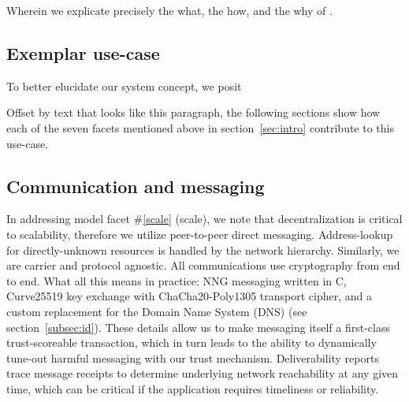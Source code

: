 %
%
%

Wherein we explicate precisely the what, the how, and the why of \projectName.

\subsection{Exemplar use-case}\label{subsec:use}

To better elucidate our system concept, we posit 

\begin{ppl}
Offset by text that looks like this paragraph, the following sections show how each of the seven facets mentioned above in section~\ref{sec:intro} contribute to this use-case.

\end{ppl}

\subsection{Communication and messaging}\label{subsec:comms}

In addressing model facet \#\ref{scale} (scale), we note that decentralization is critical to scalability, therefore we utilize peer-to-peer direct messaging.
Address-lookup for directly-unknown resources is handled by the network hierarchy.
Similarly, we are carrier and protocol agnostic.
All communications use cryptography from end to end.  %
What all this means in practice: NNG messaging written in C, Curve25519 key exchange with ChaCha20-Poly1305 transport cipher, and a custom replacement for the Domain Name System (DNS) (see section~\ref{subsec:id}).
These details allow us to make messaging itself a first-class trust-scoreable transaction, which in turn leads to the ability to dynamically tune-out harmful messaging with our trust mechanism.
Deliverability reports trace message receipts to determine underlying network reachability at any given time, which can be critical if the application requires timeliness or reliability.

